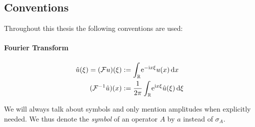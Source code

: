 \subsection{Conventions}
Throughout this thesis the following conventions are used:
\paragraph{Fourier Transform}
\begin{align*}
  \hat{u}(\xi) = (\mathcal{F}u)(\xi)
    &:= \Integ{\mathbb{R}}{x}{\Eto{-\mathrm ix\xi} u(x)} \\
  (\mathcal{F}^{-1}\hat{u})(x) &:=
  \frac{1}{2\pi}\Integ{\mathbb{R}}{\xi}{\Eto{\mathrm ix\xi}
    \hat{u}(\xi)}
\end{align*}

We will always talk about symbols and only mention amplitudes when explicitly
needed. We thus denote the \emph{symbol} of an operator $A$ by $a$ instead of
$\sigma_A$.
